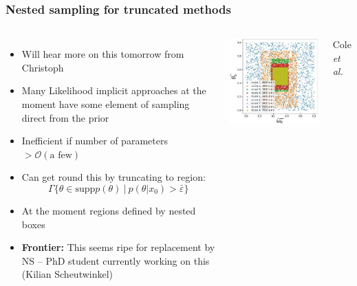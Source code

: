 \documentclass[aspectratio=169,handout]{beamer}
\begin{document}
\begin{frame}
    \frametitle{Nested sampling for truncated methods}

    \begin{columns}
        \begin{itemize}
            \item Will hear more on this tomorrow from Christoph
            \item Many Likelihood implicit approaches at the moment have some element of sampling direct from the prior
            \item Inefficient if number of parameters $>\mathcal{O}(\text{a few})$
            \item Can get round this by truncating to region:
                \[ \Gamma\{ \theta\in \mathrm{supp} p(\theta) \:|\: p(\theta|x_0)>\bar\varepsilon\} \]
            \item At the moment regions defined by nested boxes
            \item \textbf{Frontier:} This seems ripe for replacement by NS -- PhD student currently working on this (Kilian Scheutwinkel)
        \end{itemize}
        \includegraphics[width=\textwidth]{figures/tmnre}

        \hfill Cole \textit{et al.}~
    \end{columns}
    
\end{frame}
\end{document}
